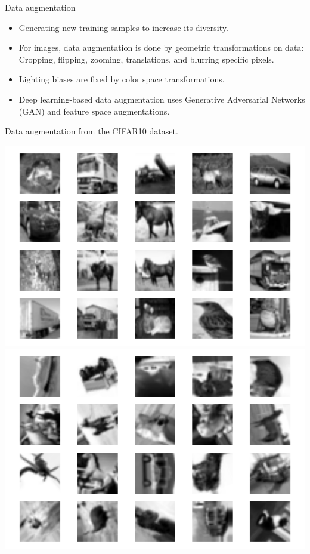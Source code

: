 \documentclass{beamer}
\begin{document}
\begin{frame}{Data augmentation}
    \begin{itemize}
    \item Generating new training  samples to increase its  diversity. 
    
    \item For images, data augmentation is done by geometric transformations on data: Cropping, flipping, zooming, translations, and blurring specific pixels. 
    
    \item Lighting biases are fixed by color space transformations. 
    \item Deep learning-based data augmentation uses Generative Adversarial Networks (GAN) and feature space augmentations. 
    
    
\end{itemize}
\begin{center}
\begin{tiny}Data augmentation from the CIFAR10 dataset.\end{tiny}

\includegraphics[scale=0.35]{Module 4 (CNN)/pics/data_cifar.pdf}
\includegraphics[scale=0.35]{Module 4 (CNN)/pics/data_aug.pdf}\\

\end{center}
\end{frame}
\end{document}
